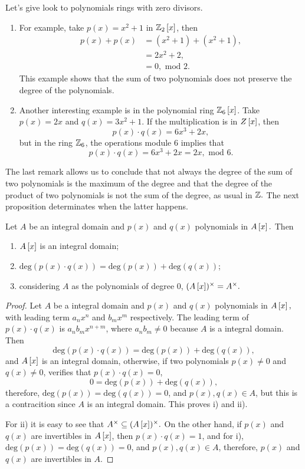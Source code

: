 \documentclass[11pt,a4paper]{article}
\begin{document}
\begin{rem}
 Let's give look to polynomials rings with zero divisors. 
 \begin{enumerate}
     \item For example, take $p(x)=x^2+1$ in $\mathbb{Z}_2\left[x\right]$, then
     \begin{align*}
     p(x)+p(x)&=(x^2+1)+(x^2+1),\\
     		  &=2x^2+2,\\
     		  &=0, \text{ mod }2.
     \end{align*}
     This example shows that the sum of two polynomials does not preserve the degree of the polynomials.
     \item Another interesting example is in the polynomial ring $\mathbb{Z}_6\left[x\right]$. Take $p(x)=2x$ and $q(x)=3x^2+1$. If the multiplication is in $Z\left[x\right]$, then \[p(x)\cdot q(x)= 6x^3+2x,\] but in the ring $\mathbb{Z}_6$, the operations module $6$ implies that
 \[p(x)\cdot q(x)= 6x^3+2x=2x,  \text{ mod }6.\]
 \end{enumerate}
\end{rem}
The last remark allows us to conclude that not always the degree of the sum of two polynomials is the maximum of the degree and that the degree of the product of two polynomials is not the sum of the degree, as usual in $\mathbb{Z}.$ The next proposition determinates when the latter happens. 

\begin{prop}
\label{IDfractions}
Let $A$ be an integral domain and $p(x)$ and $q(x)$ polynomials in $A\left[x\right].$ Then
\begin{enumerate}
    \item $A\left[x\right]$ is an integral domain;
    \item $\text{deg}(p(x)\cdot q(x)) = \text{deg}(p(x))+ \text{deg}(q(x))$;
    \item considering $A$ as the polynomials of degree 0, $(A\left[x\right])^{\times}=A^{\times}.$
\end{enumerate}
\end{prop}

\begin{proof}
    Let $A$ be a integral domain and $p(x)$ and $q(x)$ polynomials in $A\left[x\right],$ with leading term $a_nx^n$ and $b_mx^m$ respectively. The leading term of $p(x)\cdot q(x)$ is $a_nb_mx^{n+m}$, where $a_nb_m\neq 0$ because $A$ is a integral domain. Then 
    \[\text{deg}(p(x)\cdot q(x)) = \text{deg}(p(x))+ \text{deg}(q(x)),\]
    and $A\left[x\right]$ is an integral domain, otherwise, if two polynomials $p(x)\neq 0$ and $q(x)\neq 0$, verifies that $p(x)\cdot q(x)=0$,
    \[0 = \text{deg}(p(x))+ \text{deg}(q(x)),\]
    therefore, $\text{deg}(p(x))= \text{deg}(q(x))=0$, and $p(x),q(x)\in A$, but this is a contracition since $A$ is an integral domain. This proves i) and ii). 
    
   For ii) it is easy to see that $A^{\times}\subseteq (A\left[x\right])^{\times}.$ On the other hand, if $p(x)$ and $q(x)$ are invertibles in $A\left[x\right]$, then $p(x)\cdot q(x)=1$, and for i),  $\text{deg}(p(x))= \text{deg}(q(x))=0$, and $p(x),q(x)\in A$, therefore, $p(x)$ and $q(x)$ are invertibles in $A$.
\end{proof}




\end{document}
